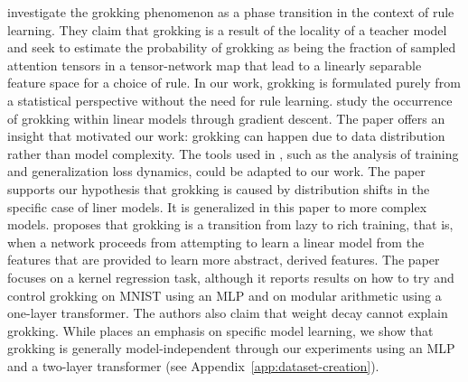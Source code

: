 \citet{vzunkovivc2022grokkingPhase} investigate the grokking phenomenon as a phase transition in the context of rule learning. They claim that grokking is a result of the locality of a teacher model and seek to estimate the probability of grokking as being the fraction of sampled attention tensors in a tensor-network map that lead to a linearly separable feature space for a choice of rule. In our work, grokking is formulated purely from a statistical perspective without the need for rule learning. 
\citet{levi2023grokkingLinear} study the occurrence of grokking within linear models through gradient descent. The paper offers an insight that motivated our work: grokking can happen due to data distribution rather than model complexity. The tools used in \cite{levi2023grokkingLinear}, such as the analysis of training and generalization loss dynamics, could be adapted to our work. The paper supports our hypothesis that grokking is caused by distribution shifts in the specific case of liner models. It is generalized in this paper to more complex models. %
\citet{kumar2024grokking} proposes that grokking is a transition from lazy to rich training, that is, when a network proceeds from attempting to learn a linear model from the features that are provided to learn more abstract, derived features. The paper focuses on a kernel regression task, although it reports results on how to try and control grokking on MNIST using an MLP and on modular arithmetic using a one-layer transformer. The authors also claim that weight decay cannot explain grokking. While \citet{kumar2024grokking} places an emphasis on specific model learning, we show that grokking is generally model-independent through our experiments using an MLP and a two-layer transformer (see Appendix~\ref{app:dataset-creation}).

